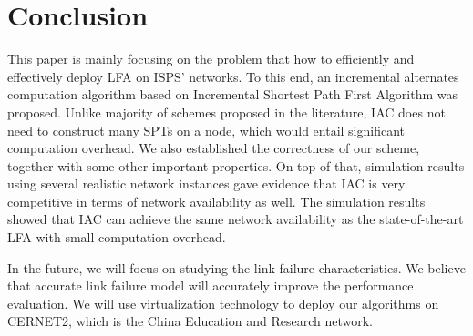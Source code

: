 \section{Conclusion}\label{conclusion}
This paper is mainly focusing on the problem that how to efficiently
and effectively deploy LFA on ISPS' networks.
To this end, an incremental alternates computation algorithm based on Incremental Shortest Path First
Algorithm was proposed.
Unlike majority of
schemes proposed in the literature, IAC does not need to construct many SPTs on a node, which would entail significant computation overhead.
We also established the correctness of our scheme,
together with some other important properties. On top of that,
simulation results using several realistic network instances
gave evidence that IAC is very competitive in terms of
network availability as well.
The simulation results showed that IAC can achieve
the same network availability as  the state-of-the-art LFA with small computation overhead.

In the future, we will focus on studying the link failure characteristics.
We believe that accurate link failure model will accurately improve  the performance evaluation.
We will use virtualization technology to deploy our algorithms on
CERNET2, which is the China Education and Research network.
